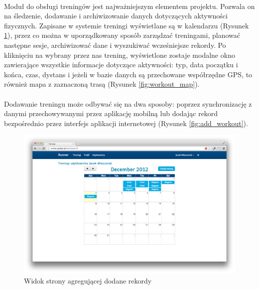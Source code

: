\paragraph{}
Moduł do obsługi treningów jest najważniejszym elementem projektu. Pozwala on na śledzenie, dodawanie i archiwizowanie danych dotyczących aktywności fizycznych. Zapisane w systemie treningi wyświetlane są w kalendarzu (Rysunek \ref{fig:workout_main}), przez co można w uporządkowany sposób zarządzać treningami, planować następne sesje, archiwizować dane i wyszukiwać wcześniejsze rekordy. Po kliknięciu na wybrany przez nas trening, wyświetlone zostaje modalne okno zawierające wszystkie informacje dotyczące aktywności: typ, data początku i końca, czas, dystans i jeżeli w bazie danych są przechowane współrzędne GPS, to również mapa z zaznaczoną trasą (Rysunek \ref{fig:workout_map}).
\paragraph{} %
\label{par:}

 Dodawanie treningu może odbywać się na dwa sposoby: poprzez synchronizację z danymi przechowywanymi przez aplikację mobilną lub dodając rekord bezpośrednio przez interfejs aplikacji internetowej (Rysunek \ref{fig:add_workout}).


\begin{figure}[ht]
	\centering
		\includegraphics[width=1\linewidth]{assets/workouts_main.png}
	\caption{Widok strony agregującej dodane rekordy}
	\label{fig:workout_main}
\end{figure}

